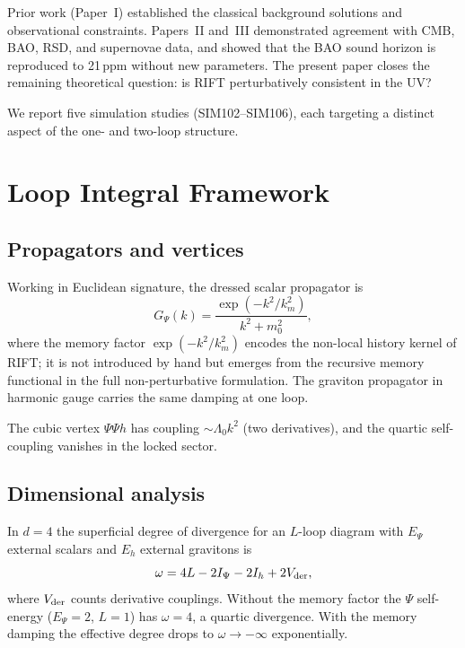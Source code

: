 \documentclass[12pt,a4paper]{article}
\begin{document}
Prior work (Paper~I) established the classical background solutions and
observational constraints.  Papers~II and~III demonstrated agreement with
CMB, BAO, RSD, and supernovae data, and showed that the BAO sound horizon
is reproduced to 21\,ppm without new parameters.  The present paper closes
the remaining theoretical question: is RIFT perturbatively consistent in
the UV?

We report five simulation studies (SIM102–SIM106), each targeting a distinct
aspect of the one- and two-loop structure.

\section{Loop Integral Framework}
\label{sec:framework}

\subsection{Propagators and vertices}

Working in Euclidean signature, the dressed scalar propagator is
\begin{equation}
G_\Psi(k) = \frac{\exp(-k^2/k_m^2)}{k^2 + m_0^2},
\label{eq:psi_prop}
\end{equation}
where the memory factor $\exp(-k^2/k_m^2)$ encodes the non-local history
kernel of RIFT; it is not introduced by hand but emerges from the recursive
memory functional in the full non-perturbative formulation.  The graviton
propagator in harmonic gauge carries the same damping at one loop.

The cubic vertex $\Psi\Psi h$ has coupling $\sim\Lambda_0 k^2$ (two
derivatives), and the quartic self-coupling vanishes in the locked sector.

\subsection{Dimensional analysis}

In $d=4$ the superficial degree of divergence for an $L$-loop diagram
with $E_\Psi$ external scalars and $E_h$ external gravitons is
\begin{equation}
\omega = 4L - 2I_\Psi - 2I_h + 2V_{\rm der},
\end{equation}
where $V_{\rm der}$ counts derivative couplings.  Without the memory
factor the $\Psi$ self-energy ($E_\Psi=2$, $L=1$) has $\omega=4$, a
quartic divergence.  With the memory damping the effective degree drops
to $\omega\to-\infty$ exponentially.
\end{document}
